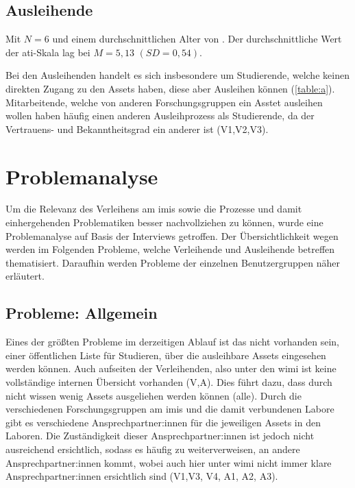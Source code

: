 \subsection*{Ausleihende}

Mit $N=6$ und einem durchschnittlichen Alter von .
Der durchschnittliche Wert der \ac{ati}-Skala lag bei $M=5,13$ $(SD=0,54)$.

Bei den Ausleihenden handelt es sich insbesondere um Studierende, welche keinen direkten Zugang zu
den Assets haben, diese aber Ausleihen können (\ref{table:a}). Mitarbeitende, welche von anderen
Forschungsgruppen ein Asstet ausleihen wollen haben häufig einen anderen Ausleihprozess als
Studierende, da der Vertrauens- und Bekanntheitsgrad ein anderer ist (V1,V2,V3).



\section{Problemanalyse}
\label{section:iststand}
        
Um die Relevanz des Verleihens am \ac{imis} sowie die Prozesse und damit einhergehenden
Problematiken besser nachvollziehen zu können, wurde eine Problemanalyse auf Basis der Interviews
getroffen. Der Übersichtlichkeit wegen werden im Folgenden Probleme, welche Verleihende und
Ausleihende betreffen thematisiert. Daraufhin werden Probleme der einzelnen Benutzergruppen
näher erläutert.

\subsection*{Probleme: Allgemein}
\label{section:probleme-allgemein}
Eines der größten Probleme im derzeitigen Ablauf ist das nicht vorhanden sein, einer öffentlichen
Liste für Studieren, über die ausleihbare Assets eingesehen werden können. Auch aufseiten der
Verleihenden, also unter den \ac{wimi} ist keine vollständige internen Übersicht vorhanden (V,A).
Dies führt dazu, dass durch nicht wissen wenig Assets ausgeliehen werden können (alle). Durch die
verschiedenen Forschungsgruppen am \ac{imis} und die damit verbundenen Labore gibt es verschiedene
Ansprechpartner:innen für die jeweiligen Assets in den Laboren. Die Zuständigkeit dieser
Ansprechpartner:innen ist jedoch nicht ausreichend ersichtlich, sodass es häufig zu weiterverweisen,
an andere Ansprechpartner:innen kommt, wobei auch hier unter \ac{wimi} nicht immer klare
Ansprechpartner:innen ersichtlich sind (V1,V3, V4, A1, A2, A3). 

